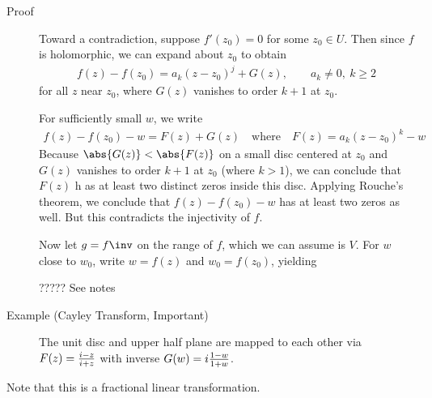 \begin{description}
\item[Proof]
Toward a contradiction, suppose \(f'(z_0) = 0\) for some \(z_0 \in U\).
Then since \(f\) is holomorphic, we can expand about \(z_0\) to obtain
\begin{align*}
f(z) - f(z_0) = a_k(z-z_0)^j + G(z), \quad\quad a_k \neq 0,~k\geq 2
\end{align*} for all \(z\) near \(z_0\), where \(G(z)\) vanishes to
order \(k+1\) at \(z_0\).

For sufficiently small \(w\), we write
\begin{align*}
f(z) - f(z_0) - w = F(z) + G(z) \quad\text{where}\quad F(z) = a_k (z-z_0)^k - w
\end{align*} Because \(\abs{G(z)} < \abs{F(z)}\) on a small disc
centered at \(z_0\) and \(G(z)\) vanishes to order \(k+1\) at \(z_0\)
(where \(k> 1\)), we can conclude that \(F(z)\) h as at least two
distinct zeros inside this disc. Applying Rouche's theorem, we conclude
that \(f(z) - f(z_0) - w\) has at least two zeros as well. But this
contradicts the injectivity of \(f\).

Now let \(g = f\inv\) on the range of \(f\), which we can assume is
\(V\). For \(w\) close to \(w_0\), write \(w = f(z)\) and
\(w_0 = f(z_0)\), yielding

????? See notes
\item[Example (Cayley Transform, Important)]
The unit disc and upper half plane are mapped to each other via
\(F(z) = {i - z \over i + z}\) with inverse
\(G(w) = i {1 - w \over 1 + w}\).
\end{description}

Note that this is a fractional linear transformation.


